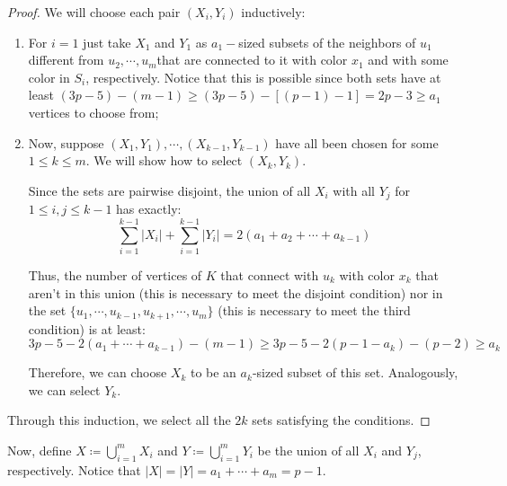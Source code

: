 \documentclass{article}
\numberwithin{table}{section}
\begin{document}
\begin{proof}
    We will choose each pair $(X_i,Y_i)$ inductively:
    \begin{enumerate}
        \item For $i=1$ just take $X_1$ and $Y_1$ as $a_1-$sized subsets of the neighbors of $u_1$ different from $u_2,\cdots,u_m $that are connected to it with color $x_1$ and with some color in $S_i$, respectively. Notice that this is possible since both sets have at least $ (3p-5)-(m-1) \geq (3p-5)-[(p-1)-1] = 2p-3\geq a_1$ vertices to choose from;
        \item Now, suppose $(X_1,Y_1),\cdots,(X_{k-1},Y_{k-1})$ have all been chosen for some $1\leq k\leq m$. We will show how to select $(X_{k},Y_{k})$.

        Since the sets are pairwise disjoint, the union of all $X_i$ with all $Y_j$ for $1\leq i,j\leq k-1$ has exactly:
$$\sum_{i=1}^{k-1}|X_i|+\sum_{i=1}^{k-1}|Y_i| = 2(a_1+a_2+\cdots+a_{k-1})$$

Thus, the number of vertices of $K$ that connect with $u_k$ with color $x_k$ that aren't in this union (this is necessary to meet the disjoint condition) nor in the set $\{u_1,\cdots,u_{k-1},u_{k+1},\cdots,u_m\}$ (this is necessary to meet the third condition) is at least:
$$3p-5-2(a_1+\cdots +a_{k-1})-(m-1)\geq 3p-5-2(p-1-a_{k})-(p-2) \geq a_{k}$$

Therefore, we can choose $X_k$ to be an $a_k$-sized subset of this set. Analogously, we can select $Y_k$.
    \end{enumerate}

Through this induction, we select all the $2k$ sets satisfying the conditions.
\end{proof}
Now, define $X \coloneq \bigcup_{i=1}^m X_i$ and $Y \coloneq \bigcup_{i=1}^m Y_i$ be the union of all $X_i$ and $Y_j$, respectively. Notice that $|X| = |Y|= a_1+\cdots+a_m = p-1$.

\medskip
\end{document}
